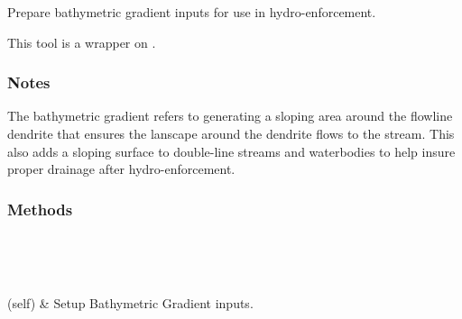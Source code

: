 \documentclass[letterpaper,10pt,english]{sphinxmanual}
\begin{document}
\begin{fulllineitems}
\label{\detokenize{StreamStats_DataPrep:StreamStats_DataPrep.SetupBathyGrad}}
Prepare bathymetric gradient inputs for use in hydro-enforcement.

This tool is a wrapper on {\hyperref[\detokenize{make_hydrodem:make_hydrodem.bathymetricGradient}]{}}.
\subsubsection*{Notes}

The bathymetric gradient refers to generating a sloping area around the flowline dendrite that ensures the lanscape around the dendrite flows to the stream. This also adds a sloping surface to double-line streams and waterbodies to help insure proper drainage after hydro-enforcement.
\subsubsection*{Methods}


\begin{savenotes}\sphinxatlongtablestart\begin{longtable}{}
\hline

\endfirsthead

%
{}\\
\hline

\endhead

\hline
{}\\
\endfoot

\endlastfoot

{\hyperref[\detokenize{StreamStats_DataPrep:StreamStats_DataPrep.SetupBathyGrad.getParameterInfo}]{}}(self)
&
Setup Bathymetric Gradient inputs.
\\
\hline
\end{longtable}\sphinxatlongtableend\end{savenotes}


\end{fulllineitems}
\end{document}
